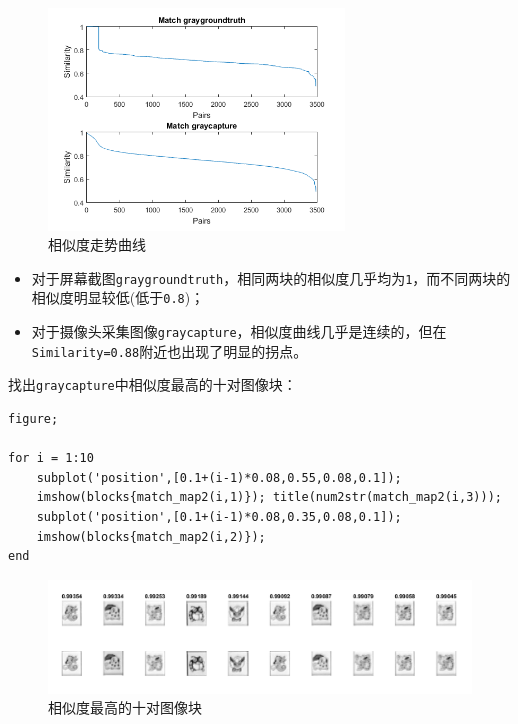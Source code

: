 \documentclass{article}
\numberwithin{figure}{section}
\numberwithin{table}{section}
\numberwithin{listing}{section}
\numberwithin{equation}{section}
\begin{document}
\begin{enumerate}
                \begin{figure}[H]
                    \centering
                    \includegraphics[width=0.7\textwidth]{similarity}
                    \caption{相似度走势曲线}
                    \label{fig:similarity}
                \end{figure}

                \begin{itemize}
                    \item 对于屏幕截图\texttt{graygroundtruth}，相同两块的相似度几乎均为\texttt{1}，而不同两块的相似度明显较低(低于\texttt{0.8})；
                    \item 对于摄像头采集图像\texttt{graycapture}，相似度曲线几乎是连续的，但在\texttt{Similarity=0.88}附近也出现了明显的拐点。
                \end{itemize}

                找出\texttt{graycapture}中相似度最高的十对图像块：

                \begin{verbatim}
figure;

for i = 1:10
    subplot('position',[0.1+(i-1)*0.08,0.55,0.08,0.1]);
    imshow(blocks{match_map2(i,1)}); title(num2str(match_map2(i,3)));
    subplot('position',[0.1+(i-1)*0.08,0.35,0.08,0.1]);
    imshow(blocks{match_map2(i,2)});
end
                \end{verbatim}

                \begin{figure}[H]
                    \centering
                    \includegraphics[width=\textwidth]{similarity10}
                    \caption{相似度最高的十对图像块}
                    \label{fig:similarity10}
                \end{figure}


\end{enumerate}
\end{document}

